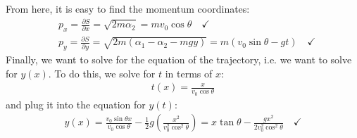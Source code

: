 \documentclass{article}
\theoremstyle{definition}
\newcommand{\p}{\partial}
\newcommand{\al}{\alpha}
\newcommand{\f}[2]{\frac{#1}{#2}}
\newcommand{\lp}{\left(}
\newcommand{\rp}{\right)}
\begin{document}
From here, it is easy to find the momentum coordinates:
\begin{align*}
&p_x = \f{\p S}{\p x} = \sqrt{2m\al_2} = mv_0\cos\theta \quad\checkmark \\
&p_y = \f{\p S}{\p y} = \sqrt{2m(\al_1 - \al_2 - mgy)} = m(v_0\sin\theta - gt) \quad\checkmark
\end{align*}
Finally, we want to solve for the equation of the trajectory, i.e. we want to solve for $y(x)$. To do this, we solve for $t$ in terms of $x$:
\begin{align*}
t(x) = \f{x}{v_0\cos\theta}
\end{align*}
and plug it into the equation for $y(t)$:
\begin{align*}
\boxed{y(x) = \f{v_0\sin\theta x}{v_0\cos\theta} - \f{1}{2}g \lp \f{x^2}{v_0^2\cos^2\theta} \rp = x\tan\theta - \f{gx^2}{2v_0^2\cos^2\theta}} \quad \checkmark
\end{align*}
\end{document}
